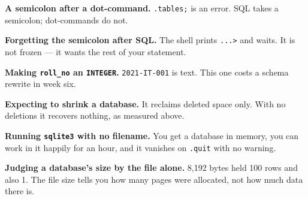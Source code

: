 \begin{pitfall}
\begin{tight}
  \item \textbf{A semicolon after a dot-command.} \texttt{.tables;} is an
        error. SQL takes a semicolon; dot-commands do not.
  \item \textbf{Forgetting the semicolon after SQL.} The shell prints
        \texttt{...>} and waits. It is not frozen --- it wants the rest of your
        statement.
  \item \textbf{Making \texttt{roll\_no} an \texttt{INTEGER}.}
        \texttt{2021-IT-001} is text. This one costs a schema rewrite in week
        six.
  \item \textbf{Expecting  to shrink a database.} It reclaims
        deleted space only. With no deletions it recovers nothing, as measured
        above.
  \item \textbf{Running \texttt{sqlite3} with no filename.} You get a database
        in memory, you can work in it happily for an hour, and it vanishes on
        \texttt{.quit} with no warning.
  \item \textbf{Judging a database's size by the file alone.} 8{,}192 bytes
        held 100 rows and also 1. The file size tells you how many pages were
        allocated, not how much data there is.
\end{tight}
\end{pitfall}

